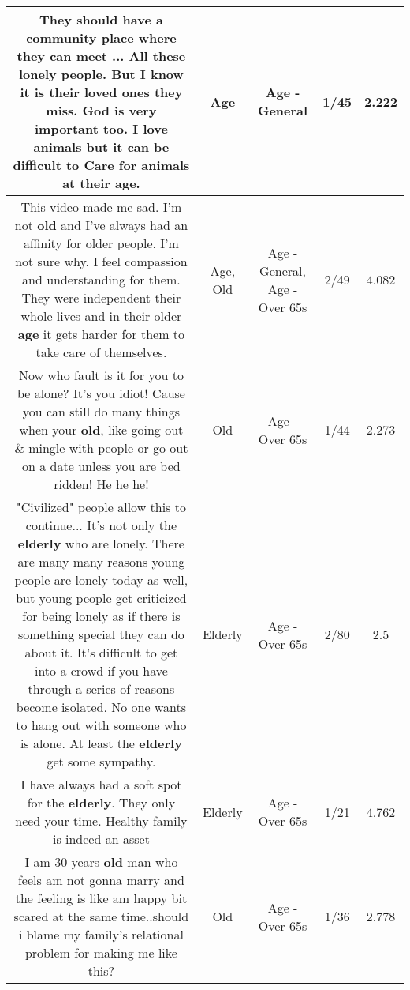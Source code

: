 \documentclass[11pt]{article}
\newlength\mylength
\begin{document}
\begin{center}
\begin{longtable}{|C{.65\mylength}|C{.30\mylength}|C{.12\mylength}|C{.12\mylength}|C{.12\mylength}|}
  \small They should have a community place where they can meet ... All these lonely people. But I know it is their loved ones they miss. God is very important too. I love animals but it can be difficult to Care for animals at  their \textbf{age}.\normalsize   & Age & Age - General & 1/45 & 2.222 \\  \hline
  \small This video made me sad. I'm not \textbf{old} and I've always had an affinity for older people. I'm not sure why. I feel compassion and understanding for them. They were independent their whole lives and in their older \textbf{age} it gets harder for them to take care of themselves.\normalsize   & Age, Old & Age - General, Age - Over 65s & 2/49 & 4.082 \\  \hline
  \small Now who fault is it for you to be alone? It's you idiot! Cause you can still do many things when your \textbf{old}, like going out \& mingle with people or go out on a date unless you are bed ridden! He he he!\normalsize   & Old & Age - Over 65s & 1/44 & 2.273 \\  \hline
  \small "Civilized" people allow this to continue...  It's not only the \textbf{elderly} who are lonely.  There are many many reasons young people are lonely today as well, but young people get criticized for being lonely as if there is something special they can do about it.  It's difficult to get into a crowd if you have through a series of reasons become isolated.  No one wants to hang out with someone who is alone.  At least the \textbf{elderly} get some sympathy.\normalsize   & Elderly & Age - Over 65s & 2/80 & 2.5 \\  \hline
  \small I have always had a soft spot for the \textbf{elderly}. They only need your time. Healthy family is indeed an asset\normalsize   & Elderly & Age - Over 65s & 1/21 & 4.762 \\  \hline
  \small I am 30 years \textbf{old} man who feels am not gonna marry and the feeling is like am happy bit scared at the same time..should i blame my family's relational problem for making me like this?\normalsize   & Old & Age - Over 65s & 1/36 & 2.778 \\  \hline

\end{longtable}
\end{center}
\end{document}
